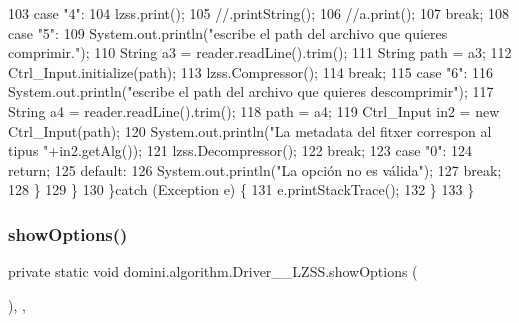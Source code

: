 \begin{DoxyCode}
103                 \textcolor{keywordflow}{case} \textcolor{stringliteral}{"4"}:
104                     lzss.print();
105                     \textcolor{comment}{//.printString();}
106                     \textcolor{comment}{//a.print();}
107                 \textcolor{keywordflow}{break};
108                 \textcolor{keywordflow}{case} \textcolor{stringliteral}{"5"}:
109                     System.out.println(\textcolor{stringliteral}{"escribe el path del archivo que quieres comprimir."});
110                     String a3 = reader.readLine().trim();
111                     String path = a3;
112                     Ctrl\_Input.initialize(path);
113                     lzss.Compressor();
114                 \textcolor{keywordflow}{break};
115                 \textcolor{keywordflow}{case} \textcolor{stringliteral}{"6"}:
116                     System.out.println(\textcolor{stringliteral}{"escribe el path del archivo que quieres descomprimir"});
117                     String a4 = reader.readLine().trim();
118                     path = a4;
119                     Ctrl\_Input in2 = \textcolor{keyword}{new} Ctrl\_Input(path);
120                     System.out.println(\textcolor{stringliteral}{"La metadata del fitxer correspon al tipus "}+in2.getAlg());
121                     lzss.Decompressor();
122                 \textcolor{keywordflow}{break};
123                 \textcolor{keywordflow}{case} \textcolor{stringliteral}{"0"}:
124                     \textcolor{keywordflow}{return};
125                 \textcolor{keywordflow}{default}:
126                     System.out.println(\textcolor{stringliteral}{"La opción no es válida"});
127                 \textcolor{keywordflow}{break};
128             \}
129         \}
130     \}\textcolor{keywordflow}{catch} (Exception e) \{
131         e.printStackTrace();
132     \}
133     \}
\end{DoxyCode}
\mbox{\label{classdomini_1_1algorithm_1_1Driver____LZSS_a4362a21690fbdb3ef42dd6f8ca0f0da6}} 
\subsubsection{\texorpdfstring{show\+Options()}{showOptions()}}
{\footnotesize\ttfamily private static void domini.\+algorithm.\+Driver\+\_\+\+\_\+\+L\+Z\+S\+S.\+show\+Options (\begin{DoxyParamCaption}{ }\end{DoxyParamCaption})\hspace{0.3cm}{\ttfamily [inline]}, {\ttfamily [static]}, {\ttfamily [private]}}



